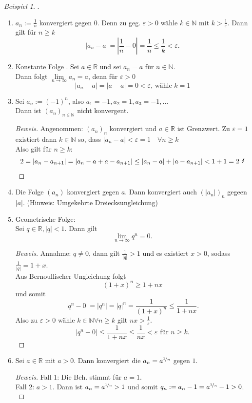 \documentclass[12pt,a4paper,titlepage]{article} %
\theoremstyle{definition}
\theoremstyle{remark}
\newtheorem*{bsp}{Beispiel}
\newenvironment{bew}{\begin{proof}[Beweis]}{\end{proof}}
\newcommand{\N}{\mathbb{N}}
\newcommand{\R}{\mathbb{R}}
\begin{document}
\begin{bsp}. %
	\begin{enumerate}
		\item $a_n := \frac{1}{n}$ konvergiert gegen $0$. Denn zu geg. $\varepsilon>0$ wähle $k\in\N$ mit $k>\frac{1}{\varepsilon}$. Dann gilt für $n\geq k$
		$$|a_n-a| = |\frac{1}{n} - 0| = \frac{1}{n} \leq \frac{1}{k} < \varepsilon.$$
		\item Konstante Folge . Sei $a\in\R$ und sei $a_n = a$ für $n\in\N$.\\
		Dann folgt $\lim\limits_{n\rightarrow\infty} a_n = a$, denn für $\varepsilon > 0$
		$$|a_n - a| = |a-a|=0<\varepsilon \text{, wähle } k=1$$
		\item Sei $a_n := (-1)^n$, also $a_1 = -1, a_2 = 1, a_3 = -1, \ldots$\\
		Dann ist $(a_n)_{n\in\N}$ nicht konvergent.
		\begin{bew}
			Angenommen: $(a_n)_n$ konvergiert und $a\in\R$ ist Grenzwert. Zu $\varepsilon = 1$ existiert dann $k\in\N$ so, dass $|a_n - a| < \varepsilon = 1 \quad \forall n\geq k$\\
			Also gilt für $n\geq k$:
			$$2 = |a_n - a_{n+1}| = |a_n - a + a - a_{n+1}| \leq |a_n - a| + |a-a_{n+1}| < 1 + 1 = 2 \text{ \Lightning}$$
		\end{bew}
		\item Die Folge $(a_n)$ konvergiert gegen $a$. Dann konvergiert auch $(|a_n|)_n$ gegeen $|a|$. (Hinweis: Umgekehrte Dreiecksungleichung)
		\item Geometrische Folge:\\
		Sei $q\in\R, |q|<1$. Dann gilt
		$$\lim\limits_{n\rightarrow\infty} q^n = 0.$$
		\begin{bew}
			Annahme: $q\neq 0$, dann gilt $\frac{1}{|q|}>1$ und es existiert $x>0$, sodass $\frac{1}{|q|} = 1 + x$.\\
			Aus Bernoullischer Ungleichung folgt $$(1+x)^n \geq 1+nx$$ und somit $$|q^n-0| = |q^n| = |q|^n = \frac{1}{(1+x)^n} \leq \frac{1}{1+nx}.$$
			Also zu $\varepsilon > 0$ wähle $k\in\N \forall n\geq k$ gilt $nx > \frac{1}{\varepsilon}$.
			$$|q^n-0|\leq \frac{1}{1+nx} \leq \frac{1}{nx} < \varepsilon \text{ für } n\geq k.$$
		\end{bew}
		\item Sei $a\in\R$ mit $a>0$. Dann konvergiert die $a_n = a^{\nicefrac{1}{n}}$ gegen $1$.
		\begin{bew}
			Fall 1: Die Beh. stimmt für $a=1$.\\
			Fall 2: $a>1$. Dann ist $a_n = a^{\nicefrac{1}{n}}>1$ und somit $q_n := a_n-1 = a^{\nicefrac{1}{n}} -1 >0$.\\

\end{bew}
\end{enumerate}
\end{bsp}
\end{document}
